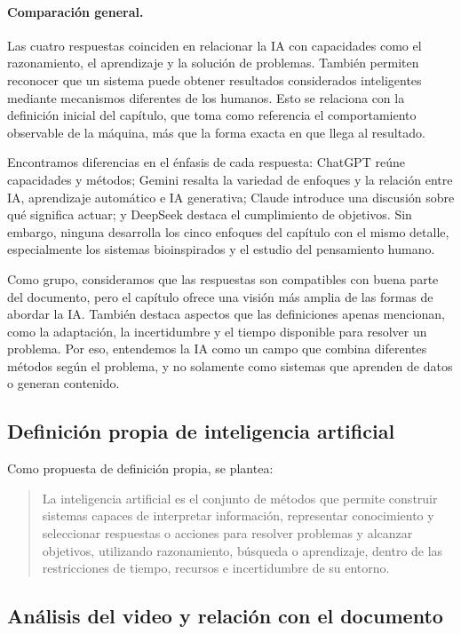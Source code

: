 \documentclass[14pt,twoside]{article}
\begin{document}
\paragraph{Comparación general.}
Las cuatro respuestas coinciden en relacionar la IA con capacidades como el razonamiento, el aprendizaje y la solución de problemas. También permiten reconocer que un sistema puede obtener resultados considerados inteligentes mediante mecanismos diferentes de los humanos. Esto se relaciona con la definición inicial del capítulo, que toma como referencia el comportamiento observable de la máquina, más que la forma exacta en que llega al resultado.

Encontramos diferencias en el énfasis de cada respuesta: ChatGPT reúne capacidades y métodos; Gemini resalta la variedad de enfoques y la relación entre IA, aprendizaje automático e IA generativa; Claude introduce una discusión sobre qué significa actuar; y DeepSeek destaca el cumplimiento de objetivos. Sin embargo, ninguna desarrolla los cinco enfoques del capítulo con el mismo detalle, especialmente los sistemas bioinspirados y el estudio del pensamiento humano.

Como grupo, consideramos que las respuestas son compatibles con buena parte del documento, pero el capítulo ofrece una visión más amplia de las formas de abordar la IA. También destaca aspectos que las definiciones apenas mencionan, como la adaptación, la incertidumbre y el tiempo disponible para resolver un problema. Por eso, entendemos la IA como un campo que combina diferentes métodos según el problema, y no solamente como sistemas que aprenden de datos o generan contenido.

\subsection{Definición propia de inteligencia artificial}

Como propuesta de definición propia, se plantea:

\begin{quote}
La inteligencia artificial es el conjunto de métodos que permite construir sistemas capaces de interpretar información, representar conocimiento y seleccionar respuestas o acciones para resolver problemas y alcanzar objetivos, utilizando razonamiento, búsqueda o aprendizaje, dentro de las restricciones de tiempo, recursos e incertidumbre de su entorno.
\end{quote}

\subsection{Análisis del video y relación con el documento}
\end{document}
